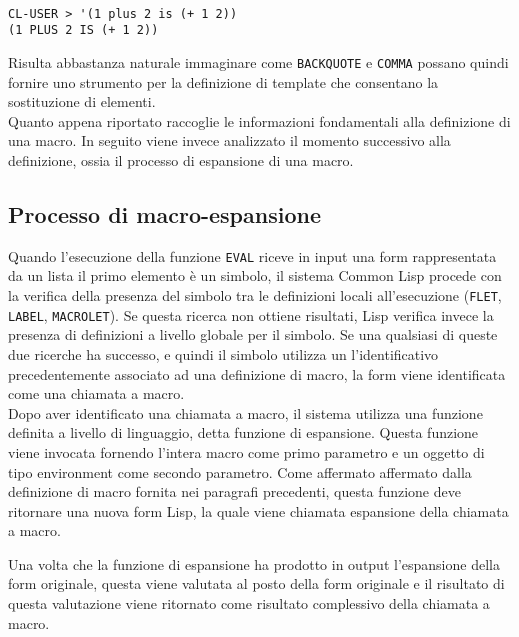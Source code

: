 \begin{lstlisting}

CL-USER > '(1 plus 2 is (+ 1 2))
(1 PLUS 2 IS (+ 1 2))

\end{lstlisting}

Risulta abbastanza naturale immaginare come \texttt{BACKQUOTE} e \texttt{COMMA}
possano quindi fornire uno strumento per la definizione di template che
consentano la sostituzione di elementi.\\

Quanto appena riportato raccoglie le informazioni fondamentali alla definizione
di una macro. In seguito viene invece analizzato il momento successivo alla
definizione, ossia il processo di espansione di una macro.

\subsection{Processo di macro-espansione}
\label{macroexpansion}

Quando l'esecuzione della funzione \texttt{EVAL} riceve in input una form
rappresentata da un lista il primo elemento è un simbolo, il sistema Common Lisp
procede con la verifica della presenza del simbolo tra le definizioni locali
all’esecuzione (\texttt{FLET}, \texttt{LABEL}, \texttt{MACROLET}). Se questa
ricerca non ottiene risultati, Lisp verifica invece la presenza di definizioni a
livello globale per il simbolo. Se una qualsiasi di queste due ricerche ha
successo, e quindi il simbolo utilizza un l’identificativo precedentemente
associato ad una definizione di macro, la form viene identificata come una
chiamata a macro.\\

Dopo aver identificato una chiamata a macro, il sistema utilizza una funzione
definita a livello di linguaggio, detta funzione di espansione. Questa funzione
viene invocata fornendo l’intera macro come primo parametro e un oggetto di tipo
environment come secondo parametro. Come affermato affermato dalla definizione
di macro fornita nei paragrafi precedenti, questa funzione deve ritornare una
nuova form Lisp, la quale viene chiamata espansione della chiamata a macro.

Una volta che la funzione di espansione ha prodotto in output l'espansione della
form originale, questa viene valutata al posto della form originale e il
risultato di questa valutazione viene ritornato come risultato complessivo della
chiamata a macro.\\

